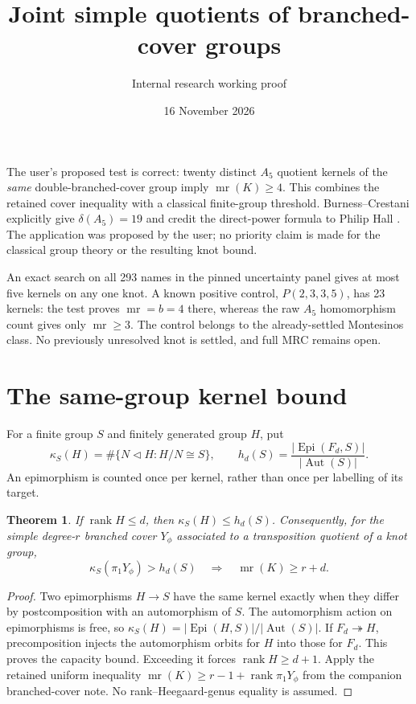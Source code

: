 \documentclass[11pt]{article}
\title{Joint simple quotients of branched-cover groups}
\author{Internal research working proof}
\date{16 November 2026}
\newtheorem{theorem}{Theorem}
\newcommand{\mr}{\operatorname{mr}}
\newcommand{\rk}{\operatorname{rank}}
\newcommand{\Epi}{\operatorname{Epi}}
\newcommand{\Aut}{\operatorname{Aut}}
\begin{document}
\maketitle

The user's proposed test is correct: twenty distinct $A_5$ quotient
kernels of the \emph{same} double-branched-cover group imply
$\mr(K)\ge4$. This combines the retained cover inequality with a
classical finite-group threshold. Burness--Crestani explicitly give
$\delta(A_5)=19$ and credit the direct-power formula to Philip Hall
\cite[p.~2]{bc}. The application was proposed by the user; no priority
claim is made for the classical group theory or the resulting knot bound.

An exact search on all 293 names in the pinned uncertainty panel gives
at most five kernels on any one knot. A known positive control,
$P(2,3,3,5)$, has 23 kernels: the test proves $\mr=b=4$ there, whereas
the raw $A_5$ homomorphism count gives only $\mr\ge3$. The control
belongs to the already-settled Montesinos class. No previously
unresolved knot is settled, and full MRC remains open.

\section{The same-group kernel bound}

For a finite group $S$ and finitely generated group $H$, put
\[
 \kappa_S(H)=\#\{N\triangleleft H:H/N\cong S\},\qquad
 h_d(S)=\frac{|\Epi(F_d,S)|}{|\Aut(S)|}.
\]
An epimorphism is counted once per kernel, rather than once per
labelling of its target.

\begin{theorem}\label{thm:capacity}
If $\rk H\le d$, then $\kappa_S(H)\le h_d(S)$. Consequently, for
the simple degree-$r$ branched cover $Y_\phi$ associated to a
transposition quotient of a knot group,
\[
 \kappa_S(\pi_1Y_\phi)>h_d(S)\quad\Longrightarrow\quad
 \mr(K)\ge r+d.
\]
\end{theorem}
\begin{proof}
Two epimorphisms $H\to S$ have the same kernel exactly when they differ
by postcomposition with an automorphism of $S$. The automorphism action
on epimorphisms is free, so $\kappa_S(H)=|\Epi(H,S)|/|\Aut(S)|$.
If $F_d\twoheadrightarrow H$, precomposition injects the automorphism
orbits for $H$ into those for $F_d$. This proves the capacity bound.
Exceeding it forces $\rk H\ge d+1$. Apply the retained uniform
inequality $\mr(K)\ge r-1+\rk\pi_1Y_\phi$ from the companion
branched-cover note. No rank--Heegaard-genus equality is assumed.
\end{proof}
\end{document}
